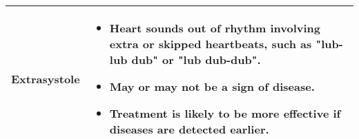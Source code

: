 \begin{table}[t]
\begin{tabular}{|p{}|p{}|}
\hline
\rule{0pt}{2ex} \centering Extrasystole & 
\begin{itemize}
    \vspace{-0.2cm}
    \item Heart sounds out of rhythm involving extra or skipped heartbeats, such as "lub-lub dub" or "lub dub-dub".
    \item May or may not be a sign of disease.
    \item Treatment is likely to be more effective if diseases are detected earlier.
    \vspace{-0.2cm}
\end{itemize} \\
\hline
\end{tabular}
\label{tab:heart_anomalies}
\end{table}